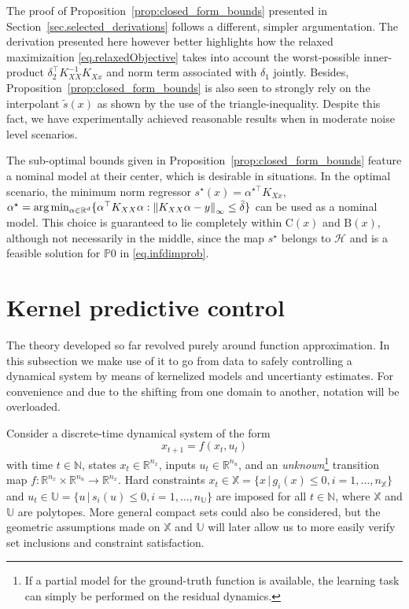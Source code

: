 The proof of Proposition~\ref{prop:closed_form_bounds} presented in Section~\ref{sec.selected_derivations} follows a different, simpler argumentation. The derivation presented here however better highlights how the relaxed maximizaition \eqref{eq.relaxedObjective} takes into account the worst-possible inner-product $\delta_2^\top K_{XX}^{-1}K_{Xx}$ and norm term associated with $\delta_1$ jointly. Besides, Proposition~\ref{prop:closed_form_bounds} is also seen to strongly rely on the interpolant $\tilde s(x)$ as shown by the use of the triangle-inequality.  Despite this fact, we have experimentally achieved reasonable results when in moderate noise level scenarios.

\begin{remark}
	The sub-optimal bounds given in Proposition~\ref{prop:closed_form_bounds} feature a nominal model at their center, which is desirable in situations. In the optimal scenario, the minimum norm regressor $s^\star(x) = \alpha^{\star\top} K_{Xx}$, $\alpha^\star = \text{arg}\min_{\alpha \in \mathbb{R}^d} \{ \alpha^\top K_{XX} \alpha : \left\| K_{XX} \alpha - y \right\|_\infty \leq \bar\delta \}$ can be used as a nominal model. This choice is guaranteed to lie completely within $\text{C}(x)$ and $\text{B}(x)$, although not necessarily in the middle, since the map $s^\star$ belongs to $\mathcal{H}$ and is a feasible solution for $\mathds{P}0$ in \eqref{eq.infdimprob}.
\end{remark}

\section{Kernel predictive control}
\label{sec.kpc}

The theory developed so far revolved purely around function approximation. In this subsection we make use of it to go from data to safely controlling a dynamical system by means of kernelized models and uncertianty estimates. For convenience and due to the shifting from one domain to another, notation will be overloaded.

Consider a discrete-time dynamical system of the form 
\begin{equation}
	\label{eq.dyn_sys}
	x_{t+1} = f(x_t,u_t)	
\end{equation}
with time $t \in \mathbb{N}$, states $x_t \in \mathbb{R}^{n_x}$, inputs $u_t \in \mathbb{R}^{n_u}$, and an \textit{unknown}\footnote{If a partial model for the ground-truth function is available, the learning task can simply be performed on the residual dynamics.} transition map $f: \mathbb{R}^{n_x} \times \mathbb{R}^{n_u} \rightarrow \mathbb{R}^{n_x}$. Hard constraints $x_t \in \mathbb{X} = \{x \, | \, g_i(x) \leq 0, i=1,\dots,n_{\mathbb{X}}\}$ and $u_t \in \mathbb{U} = \{u \, | \, s_i(u) \leq 0, i=1,\dots,n_{\mathbb{U}}\}$ are imposed for all $t \in \mathbb{N}$, where $\mathbb{X}$ and $\mathbb{U}$ are polytopes. More general compact sets could also be considered, but the geometric assumptions made on $\mathbb{X}$ and $\mathbb{U}$ will later allow us to more easily verify set inclusions and constraint satisfaction.


